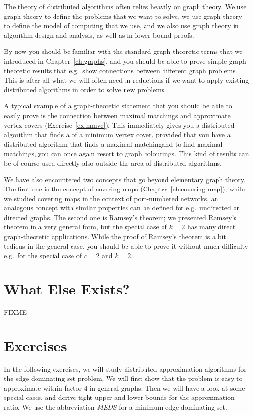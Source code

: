The theory of distributed algorithms often relies heavily on graph theory. We use graph theory to define the problems that we want to solve, we use graph theory to define the model of computing that we use, and we also use graph theory in algorithm design and analysis, as well as in lower bound proofs.

By now you should be familiar with the standard graph-theoretic terms that we introduced in Chapter~\ref{ch:graphs}, and you should be able to prove simple graph-theoretic results that e.g.\ show connections between different graph problems. This is after all what we will often need in reductions if we want to apply existing distributed algorithms in order to solve new problems.

A typical example of a graph-theoretic statement that you should be able to easily prove is the connection between maximal matchings and approximate vertex covers (Exercise~\ref{ex:mmvc}). This immediately gives you a distributed algorithm that finds a  of a minimum vertex cover, provided that you have a distributed algorithm that finds a maximal matching\mydash and to find maximal matchings, you can once again resort to graph colourings. This kind of results can be of course used directly also outside the area of distributed algorithms.

We have also encountered two concepts that go beyond elementary graph theory. The first one is the concept of covering maps (Chapter~\ref{ch:covering-map}); while we studied covering maps in the context of port-numbered networks, an analogous concept with similar properties can be defined for e.g.\ undirected or directed graphs. The second one is Ramsey's theorem; we presented Ramsey's theorem in a very general form, but the special case of $k = 2$ has many direct graph-theoretic applications. While the proof of Ramsey's theorem is a bit tedious in the general case, you should be able to prove it without much difficulty e.g.\ for the special case of $c = 2$ and $k = 2$.


\section{What Else Exists?}

FIXME


\section{Exercises}

In the following exercises, we will study distributed approximation algorithms for the edge dominating set problem. We will first show that the problem is easy to approximate within factor $4$ in general graphs. Then we will have a look at some special cases, and derive tight upper and lower bounds for the approximation ratio. We use the abbreviation \emph{MEDS} for a minimum edge dominating set.

